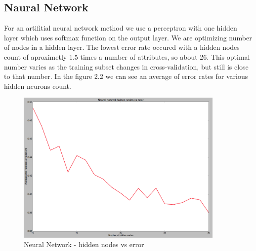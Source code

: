 \subsection{Naural Network}
For an artifitial neural network method we use a perceptron with one hidden layer which uses softmax function
on the output layer. We are optimizing number of nodes in a hidden layer. The lowest error rate occured with a
hidden nodes count of aproximetly 1.5 times a number of attributes, so about 26. This optimal number varies 
as the training subset changes in cross-validation, but still is close to that number. In the figure 2.2
we can see an average of error rates for various hidden neurons count.
\begin{figure}[!tbh]
	\centering
	\includegraphics[width=0.9\textwidth]{figures/NN_hiddennodes}
	\caption{Neural Network - hidden nodes vs error}
	\label{fig:NN_hiddennodes}
\end{figure}
